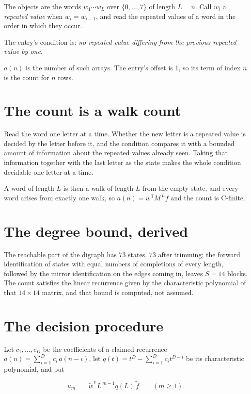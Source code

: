 \documentclass[11pt]{article}
\theoremstyle{definition}
\begin{document}
The objects are the words $w_1\cdots w_L$ over $\{0,\dots,7\}$ of length $L = n$. Call $w_i$ a {\itshape repeated value} when $w_i = w_{i-1}$, and read the repeated values of a word in the order in which they occur.

The entry's condition is: {\itshape no repeated value differing from the previous repeated value by one}.

$a(n)$ is the number of such arrays. The entry's offset is 1, so its term of index $n$ is the count for $n$ rows.

\section{The count is a walk count}

Read the word one letter at a time. Whether the new letter is a repeated value is decided by the letter before it, and the condition compares it with a bounded amount of information about the repeated values already seen. Taking that information together with the last letter as the state makes the whole condition decidable one letter at a time.

A word of length $L$ is then a walk of length $L$ from the empty state, and every word arises from exactly one walk, so $a(n) = w^{\mathsf T}M^{\,L}f$ and the count is C-finite.

\section{The degree bound, derived}

The reachable part of the digraph has $73$ states, $73$ after trimming; the forward identification of states with equal numbers of completions of every length, followed by the mirror identification on the edges coming in, leaves $S = 14$ blocks. The count satisfies the linear recurrence given by the characteristic polynomial of that $14\times14$ matrix, and that bound is computed, not assumed.

\section{The decision procedure}

Let $c_1,\dots,c_D$ be the coefficients of a claimed recurrence $a(n) = \sum_{i=1}^{D} c_i\,a(n-i)$, let $q(t) = t^{D} - \sum_{i=1}^{D} c_i t^{D-i}$ be its characteristic polynomial, and put

\[u_m \;=\; \tilde w^{\mathsf T} L^{\,m-1} q(L)\,\tilde f \qquad (m \ge 1).\]
\end{document}
